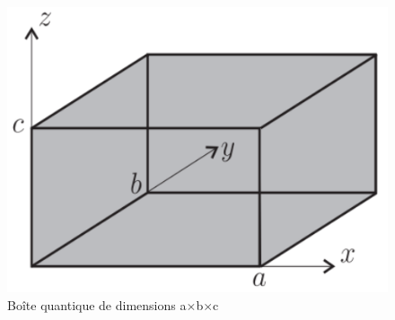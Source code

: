\documentclass{article}
\begin{document}
\begin{figure}[h]
    \centering
    \includegraphics[scale=0.3]{figure2.png}
    \caption{Boîte quantique de dimensions a$\times$b$\times$c}
\end{figure}
\end{document}
